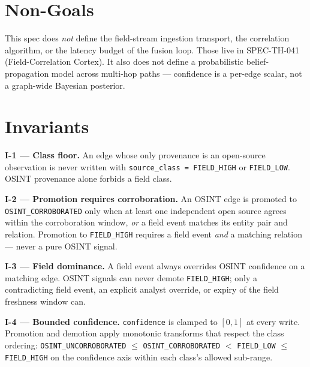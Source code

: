 \section{Non-Goals}
\begin{nongoal}
This spec does \emph{not} define the field-stream ingestion transport, the correlation algorithm, or the latency budget of the fusion loop. Those live in SPEC-TH-041 (Field-Correlation Cortex). It also does not define a probabilistic belief-propagation model across multi-hop paths --- confidence is a per-edge scalar, not a graph-wide Bayesian posterior.
\end{nongoal}

\section{Invariants}

\begin{invariant}
\textbf{I-1 --- Class floor.} An edge whose only provenance is an open-source observation is never written with \texttt{source\_class = FIELD\_HIGH} or \texttt{FIELD\_LOW}. OSINT provenance alone forbids a field class.
\end{invariant}

\begin{invariant}
\textbf{I-2 --- Promotion requires corroboration.} An OSINT edge is promoted to \texttt{OSINT\_CORROBORATED} only when at least one independent open source agrees within the corroboration window, \emph{or} a field event matches its entity pair and relation. Promotion to \texttt{FIELD\_HIGH} requires a field event \emph{and} a matching relation --- never a pure OSINT signal.
\end{invariant}

\begin{invariant}
\textbf{I-3 --- Field dominance.} A field event always overrides OSINT confidence on a matching edge. OSINT signals can never demote \texttt{FIELD\_HIGH}; only a contradicting field event, an explicit analyst override, or expiry of the field freshness window can.
\end{invariant}

\begin{invariant}
\textbf{I-4 --- Bounded confidence.} \texttt{confidence} is clamped to $[0, 1]$ at every write. Promotion and demotion apply monotonic transforms that respect the class ordering: \texttt{OSINT\_UNCORROBORATED} $\leq$ \texttt{OSINT\_CORROBORATED} $<$ \texttt{FIELD\_LOW} $\leq$ \texttt{FIELD\_HIGH} on the confidence axis within each class's allowed sub-range.
\end{invariant}

